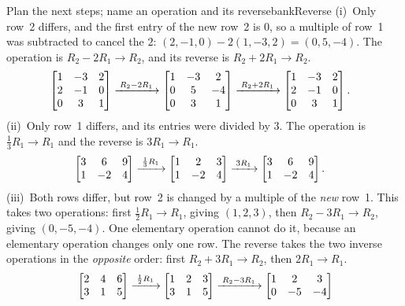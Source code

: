 \documentclass[11pt]{article}
\begin{document}
\begin{exmp}{Plan the next steps; name an operation and its reverse}{bankReverse}
(i)~Only row~2 differs, and the first entry of the new row~2 is $0$, so a multiple of row~1 was subtracted to cancel the $2$: $(2,-1,0)-2(1,-3,2)=(0,5,-4)$. The operation is $R_2-2R_1\to R_2$, and its reverse is $R_2+2R_1\to R_2$.
\begin{align*}
&\begin{bmatrix}1&-3&2\\2&-1&0\\0&3&1\end{bmatrix}
\xrightarrow{\;R_2-2R_1\;}
\begin{bmatrix}1&-3&2\\0&5&-4\\0&3&1\end{bmatrix}
\xrightarrow{\;R_2+2R_1\;}
\begin{bmatrix}1&-3&2\\2&-1&0\\0&3&1\end{bmatrix}.
\end{align*}
(ii)~Only row~1 differs, and its entries were divided by $3$. The operation is $\tfrac13R_1\to R_1$ and the reverse is $3R_1\to R_1$.
\begin{align*}
&\begin{bmatrix}3&6&9\\1&-2&4\end{bmatrix}
\xrightarrow{\;\frac13R_1\;}
\begin{bmatrix}1&2&3\\1&-2&4\end{bmatrix}
\xrightarrow{\;3R_1\;}
\begin{bmatrix}3&6&9\\1&-2&4\end{bmatrix}.
\end{align*}
(iii)~Both rows differ, but row~2 is changed by a multiple of the \emph{new} row~1. This takes two operations: first $\tfrac12R_1\to R_1$, giving $(1,2,3)$, then $R_2-3R_1\to R_2$, giving $(0,-5,-4)$. One elementary operation cannot do it, because an elementary operation changes only one row. The reverse takes the two inverse operations in the \emph{opposite} order: first $R_2+3R_1\to R_2$, then $2R_1\to R_1$.
\begin{align*}
&\begin{bmatrix}2&4&6\\3&1&5\end{bmatrix}
\rops{\frac12R_1}
\begin{bmatrix}1&2&3\\3&1&5\end{bmatrix}
\rops{R_2-3R_1}
\begin{bmatrix}1&2&3\\0&-5&-4\end{bmatrix}\\[4pt]

\end{align*}
\end{exmp}
\end{document}
